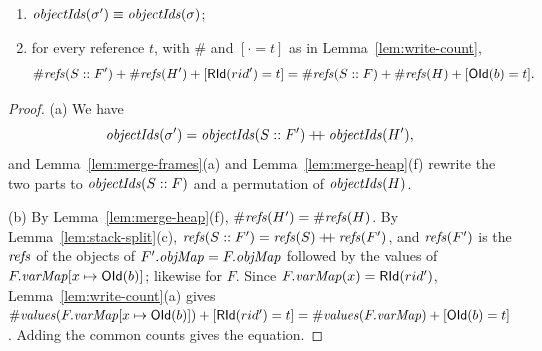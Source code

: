 \begin{lemma}
\label{lem:merge-count}
\begin{enumerate}[nosep,label=(\alph*)]
  \item $\mathit{objectIds}(\sigma') \equiv \mathit{objectIds}(\sigma)$; 
  \item for every reference $t$, with $\#$ and $[\cdot = t]$ as in Lemma~\ref{lem:write-count},
    \[ \#\mathit{refs}(S :: F') + \#\mathit{refs}(H') + [\mathsf{RId}(rid') = t]
       = \#\mathit{refs}(S :: F) + \#\mathit{refs}(H) + [\mathsf{OId}(b) = t]. \]
\end{enumerate}
\end{lemma}
\begin{proof}
(a) We have
\[ \mathit{objectIds}(\sigma') = \mathit{objectIds}(S :: F') \mathbin{+\!\!+} \mathit{objectIds}(H'), \]
and Lemma~\ref{lem:merge-frames}(a) and
Lemma~\ref{lem:merge-heap}(f) rewrite the two parts to $\mathit{objectIds}(S :: F)$ and a permutation of
$\mathit{objectIds}(H)$.

(b) By Lemma~\ref{lem:merge-heap}(f), $\#\mathit{refs}(H') = \#\mathit{refs}(H)$. By
Lemma~\ref{lem:stack-split}(c), $\mathit{refs}(S :: F') = \mathit{refs}(S) \mathbin{+\!\!+} \mathit{refs}(F')$, and $\mathit{refs}(F')$ is the
$\mathit{refs}$ of the objects of $F'.\mathit{objMap} = F.\mathit{objMap}$ followed by the values of $F.\mathit{varMap}[x \mapsto \mathsf{OId}(b)]$;
likewise for $F$. Since $F.\mathit{varMap}(x) = \mathsf{RId}(rid')$, Lemma~\ref{lem:write-count}(a) gives
$\#\mathit{values}(F.\mathit{varMap}[x \mapsto \mathsf{OId}(b)]) + [\mathsf{RId}(rid') = t] = \#\mathit{values}(F.\mathit{varMap}) +
[\mathsf{OId}(b) = t]$. Adding the common counts gives the equation.
\end{proof}

